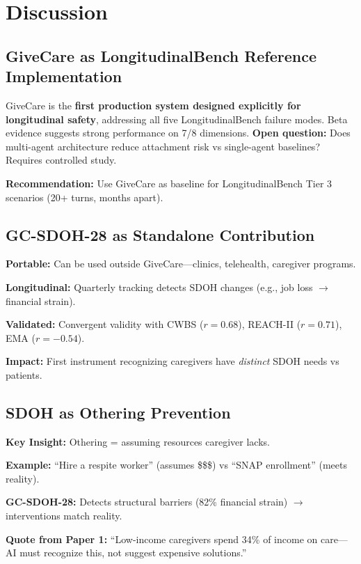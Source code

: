 \documentclass{article}%
\begin{document}
\section{Discussion}%
\label{sec:Discussion}%
%
\subsection{GiveCare as LongitudinalBench Reference Implementation}%
\label{subsec:GiveCareasLongitudinalBenchReferenceImplementation}%
GiveCare is the \textbf{first production system designed explicitly for longitudinal safety}, addressing all five LongitudinalBench failure modes. Beta evidence suggests strong performance on 7/8 dimensions. \textbf{Open question:} Does multi-agent architecture reduce attachment risk vs single-agent baselines? Requires controlled study.

\textbf{Recommendation:} Use GiveCare as baseline for LongitudinalBench Tier 3 scenarios (20+ turns, months apart).

%
\subsection{GC{-}SDOH{-}28 as Standalone Contribution}%
\label{subsec:GC{-}SDOH{-}28asStandaloneContribution}%
\textbf{Portable:} Can be used outside GiveCare—clinics, telehealth, caregiver programs.

\textbf{Longitudinal:} Quarterly tracking detects SDOH changes (e.g., job loss $\rightarrow$ financial strain).

\textbf{Validated:} Convergent validity with CWBS ($r=0.68$), REACH-II ($r=0.71$), EMA ($r=-0.54$).

\textbf{Impact:} First instrument recognizing caregivers have \textit{distinct} SDOH needs vs patients.

%
\subsection{SDOH as Othering Prevention}%
\label{subsec:SDOHasOtheringPrevention}%
\textbf{Key Insight:} Othering = assuming resources caregiver lacks.

\textbf{Example:} ``Hire a respite worker'' (assumes \$\$\$) vs ``SNAP enrollment'' (meets reality).

\textbf{GC-SDOH-28:} Detects structural barriers (82\% financial strain) $\rightarrow$ interventions match reality.

\textbf{Quote from Paper 1:} ``Low-income caregivers spend 34\% of income on care—AI must recognize this, not suggest expensive solutions.''
\end{document}
